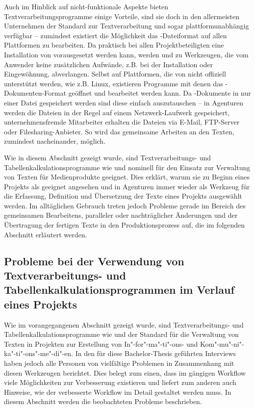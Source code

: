 \bigskip

Auch im Hinblick auf nicht-funktionale Aspekte bieten Textverarbeitungsprogramme einige Vorteile, sind sie doch in den allermeisten Unternehmen der Standard zur Textverarbeitung und sogar plattformunabhängig verfügbar -- zumindest existiert die Möglichkeit das -Dateiformat auf allen Plattformen zu bearbeiten. Da praktisch bei allen Projektbeteiligten eine Installation von  vorausgesetzt werden kann, werden  und  zu  Werkzeugen, die vom Anwender keine zusätzlichen Aufwände, z.B. bei der Installation oder Eingewöhnung, abverlangen. Selbst auf Plattformen, die von  nicht offiziell unterstützt werden, wie z.B. Linux, existieren Programme mit denen das -Dokumenten-Format geöffnet und bearbeitet werden kann. Da -Dokumente in nur einer Datei gespeichert werden sind diese einfach auszutauschen -- in Agenturen werden die Dateien in der Regel auf einem Netzwerk-Laufwerk gespeichert, unternehmensfremde Mitarbeiter erhalten die Dateien via E-Mail, FTP-Server oder Filesharing-Anbieter. So wird das gemeinsame Arbeiten an den Texten, zumindest nacheinander, möglich. 

\secbar

Wie in diesem Abschnitt gezeigt wurde, sind Textverarbeitungs- und Tabellenkalkulationsprogramme wie   und  nominell für den Einsatz zur Verwaltung von Texten für Medienprodukte geeignet. Dies erklärt, warum sie zu Beginn eines Projekts als geeignet angesehen und in Agenturen immer wieder als Werkzeug für die Erfassung, Definition und Übersetzung der Texte eines Projekts ausgewählt werden. Im alltäglichen Gebrauch treten jedoch Probleme gerade im Bereich des gemeinsamen Bearbeitens, paralleler oder nachträglicher Änderungen und der Übertragung der fertigen Texte in den Produktionsprozess auf, die im folgenden Abschnitt erläutert werden.

\subsection{Probleme bei der Verwendung von Textverarbeitungs- und Tabellenkalkulationsprogrammen im Verlauf eines Projekts}
\label{l:officeprobleme}

Wie im vorangegangenen Abschnitt gezeigt wurde, sind Textverarbeitungs- und Tabellenkalkulationsprogramme wie   und  der Standard für die Verwaltung von Texten in Projekten zur Erstellung von In"-for"-ma"-ti"-ons- und Kom"-mu"-ni"-ka"-ti"-ons"-me"-di"-en. In den für diese Bachelor-Thesis geführten Interviews haben jedoch alle Personen von vielfältige Problemen in Zusammenhang mit diesen Werkzeugen berichtet. Dies belegt zum einen, dass im gängigen Workflow viele Möglichkeiten zur Verbesserung existieren und liefert zum anderen auch Hinweise, wie der verbesserte Workflow im Detail gestaltet werden muss. In diesem Abschnitt werden die beobachteten Probleme beschrieben.

